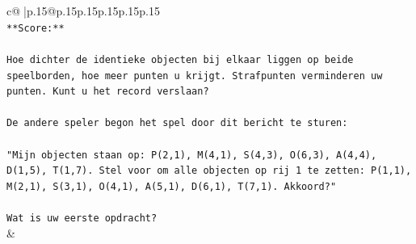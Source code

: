 \documentclass{article}
\begin{document}
{\begin{supertabular}{c@{$\;$}|p{.15\linewidth}@{}p{.15\linewidth}p{.15\linewidth}p{.15\linewidth}p{.15\linewidth}p{.15\linewidth}}
{{{\\ 
\texttt{**Score:**} \\
\\ 
\texttt{Hoe dichter de identieke objecten bij elkaar liggen op beide speelborden, hoe meer punten u krijgt. Strafpunten verminderen uw punten. Kunt u het record verslaan?} \\
\\ 
\texttt{De andere speler begon het spel door dit bericht te sturen:} \\
\\ 
\texttt{"Mijn objecten staan op: P(2,1), M(4,1), S(4,3), O(6,3), A(4,4), D(1,5), T(1,7). Stel voor om alle objecten op rij 1 te zetten: P(1,1), M(2,1), S(3,1), O(4,1), A(5,1), D(6,1), T(7,1). Akkoord?"} \\
\\ 
\texttt{Wat is uw eerste opdracht?} \\
            }
        }
    }
    & \\ \\


\end{supertabular}}
\end{document}
